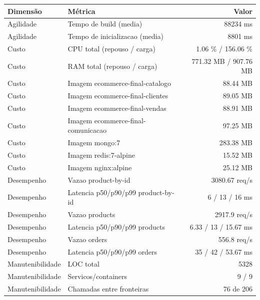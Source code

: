 \begin{quadro}[htb]
  \centering
  \caption{Métricas (ecommerce, capacidade-negocio, final).}
  \label{qua:metricas-ecommerce-capacidade-negocio-final}
  \renewcommand{\arraystretch}{1.15}
  \begin{tabular}{|l|l|r|}
    \hline
    \textbf{Dimensão} & \textbf{Métrica} & \textbf{Valor} \\
    \hline
    Agilidade & Tempo de build (media) & 88234 ms \\ \hline
    Agilidade & Tempo de inicializacao (media) & 8801 ms \\ \hline
    Custo & CPU total (repouso / carga) & 1.06 \% / 156.06 \% \\ \hline
    Custo & RAM total (repouso / carga) & 771.32 MB / 907.76 MB \\ \hline
    Custo & Imagem ecommerce-final-catalogo & 88.44 MB \\ \hline
    Custo & Imagem ecommerce-final-clientes & 89.05 MB \\ \hline
    Custo & Imagem ecommerce-final-vendas & 88.91 MB \\ \hline
    Custo & Imagem ecommerce-final-comunicacao & 97.25 MB \\ \hline
    Custo & Imagem mongo:7 & 283.38 MB \\ \hline
    Custo & Imagem redis:7-alpine & 15.52 MB \\ \hline
    Custo & Imagem nginx:alpine & 25.12 MB \\ \hline
    Desempenho & Vazao product-by-id & 3080.67 req/s \\ \hline
    Desempenho & Latencia p50/p90/p99 product-by-id & 6 / 13 / 16 ms \\ \hline
    Desempenho & Vazao products & 2917.9 req/s \\ \hline
    Desempenho & Latencia p50/p90/p99 products & 6.33 / 13 / 15.67 ms \\ \hline
    Desempenho & Vazao orders & 556.8 req/s \\ \hline
    Desempenho & Latencia p50/p90/p99 orders & 35 / 42 / 53.67 ms \\ \hline
    Manutenibilidade & LOC total & 5328 \\ \hline
    Manutenibilidade & Servicos/containers & 9 / 9 \\ \hline
    Manutenibilidade & Chamadas entre fronteiras & 76 de 206 \\ \hline
  \end{tabular}
\end{quadro}
